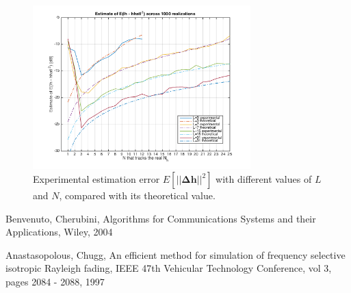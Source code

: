 \documentclass[10pt]{article}
\begin{document}
\begin{figure}[ht]
	\centering
	\includegraphics[width=0.75\textwidth]{p02_comparetheoreticaldeltah}
	\caption{Experimental estimation error $E[||\mathbf{\Delta h}||^2]$ with different values of $L$ and $N$, compared with its theoretical value.}
    \label{fig:p02_comparetheoreticaldeltah}
\end{figure}


\begin{thebibliography}{10}

Benvenuto, Cherubini, Algorithms for Communications Systems and their Applications, Wiley, 2004

Anastasopolous, Chugg, An efficient method for simulation of frequency selective isotropic Rayleigh fading, IEEE 47th Vehicular Technology Conference, vol 3, pages 2084 - 2088, 1997

\end{thebibliography}
\end{document}
